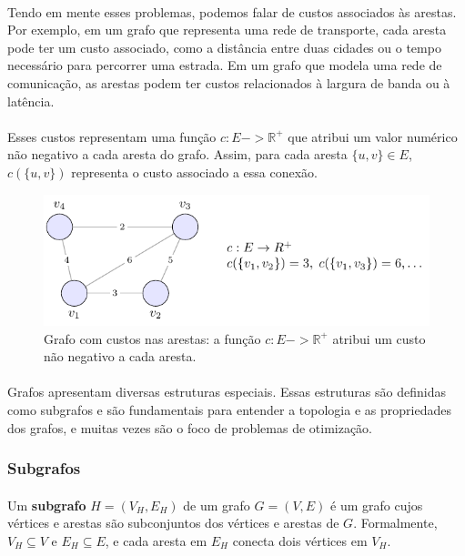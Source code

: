 \documentclass[12pt,a4paper]{article}
\def\to{->}%
\begin{document}
\paragraph{}
Tendo em mente esses problemas, podemos falar de custos associados às arestas. Por exemplo, em um grafo que representa uma rede de transporte, cada aresta pode ter um custo associado, como a distância entre duas cidades ou o tempo necessário para percorrer uma estrada. Em um grafo que modela uma rede de comunicação, as arestas podem ter custos relacionados à largura de banda ou à latência.

\paragraph{}
Esses custos representam uma função \(c: E \to \mathbb{R}^+\) que atribui um valor numérico não negativo a cada aresta do grafo. Assim, para cada aresta \(\{u, v\} \in E\), \(c(\{u, v\})\) representa o custo associado a essa conexão.


\begin{figure}[H]
    \centering
    \includegraphics[width=0.9\linewidth]{figures/fig_grafo_custos.pdf}

    \caption{Grafo com custos nas arestas: a função $c:E\to\mathbb{R}^+$ atribui um custo não negativo a cada aresta.}
    \label{fig:grafo-custos}
\end{figure}


\paragraph{}
Grafos apresentam diversas estruturas especiais. Essas estruturas são definidas como subgrafos e são fundamentais para entender a topologia e as propriedades dos grafos, e muitas vezes são o foco de problemas de otimização.

\subsubsection{Subgrafos}
\paragraph{}Um \textbf{subgrafo} \(H = (V_H, E_H)\) de um grafo \(G = (V, E)\) é um grafo cujos vértices e arestas são subconjuntos dos vértices e arestas de \(G\). Formalmente, \(V_H \subseteq V\) e \(E_H \subseteq E\), e cada aresta em \(E_H\) conecta dois vértices em \(V_H\).
\end{document}
